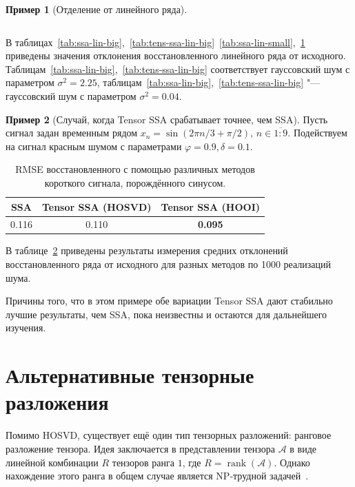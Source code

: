 \documentclass[specialist,
    substylefile = spbu_report.rtx,
    subf,href,colorlinks=true, 12pt]{disser}
\theoremstyle{plain}
\theoremstyle{definition}
\newtheorem{example}{Пример}[section]
\theoremstyle{remark}
\begin{document}
\begin{example}[Отделение от линейного ряда]
\begin{table}[!ht]
\begin{tabular}{r|r|rrrrr}
                \hline
            \end{tabular}\label{tab:tens-ssa-lin-small}
        \end{table}
        В таблицах~\ref{tab:ssa-lin-big},~\ref{tab:tens-ssa-lin-big}~\ref{tab:ssa-lin-small},~\ref{tab:tens-ssa-lin-small}
        приведены значения отклонения восстановленного линейного ряда от исходного.
        Таблицам~\ref{tab:ssa-lin-big},~\ref{tab:tens-ssa-lin-big} соответствует гауссовский шум с параметром $\sigma^2=2.25$,
        таблицам~\ref{tab:ssa-lin-big},~\ref{tab:tens-ssa-lin-big} "--- гауссовский шум с параметром $\sigma^2=0.04$.
    \end{example}

    \begin{example}[Случай, когда Tensor SSA срабатывает точнее, чем SSA]
        Пусть сигнал задан временным рядом $x_n = \sin(2\pi n/3 + \pi /2),\, n\in \overline{1:9}$.
        Подействуем на сигнал красным шумом с параметрами $\varphi=0.9, \delta = 0.1$.
        \begin{table}[!ht]
            \centering
            \caption{RMSE восстановленного с помощью различных методов короткого сигнала, порождённого синусом.}
            \begin{tabular}{ccc}
                \hline
                SSA   & Tensor SSA (HOSVD) & Tensor SSA (HOOI) \\
                \hline
                0.116 & 0.110              & \textbf{0.095}    \\
                \hline
            \end{tabular}\label{tab:tssa-better-ssa}
        \end{table}
        В таблице~\ref{tab:tssa-better-ssa} приведены результаты измерения средних отклонений восстановленного ряда от исходного
        для разных методов по 1000 реализаций шума.

        Причины того, что в этом примере обе вариации Tensor SSA дают стабильно лучшие результаты, чем SSA, пока неизвестны
        и остаются для дальнейшего изучения.
    \end{example}


    \section{Альтернативные тензорные разложения}\label{sec:other-decomp}
    Помимо HOSVD, существует ещё один тип тензорных разложений: ранговое разложение тензора.
    Идея заключается в представлении тензора $\mathcal{A}$ в виде линейной комбинации $R$ тензоров ранга $1$, где $R=\operatorname{rank}(\mathcal{A})$.
    Однако нахождение этого ранга в общем случае является NP-трудной задачей~\cite{NP-hard}.
\end{document}
